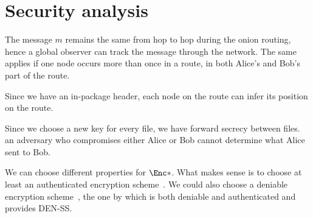\section{Security analysis}%
\label{SecurityAnalysis}


The message \(m\) remains the same from hop to hop during the onion routing, 
hence a global observer can track the message through the network.
The same applies if one node occurs more than once in a route, \eg in both 
Alice's and Bob's part of the route.

Since we have an in-package header, each node on the route can infer its 
position on the route.

Since we choose a new key for every file, we have forward secrecy between files.
\Eg an adversary who compromises either Alice or Bob cannot determine what Alice 
sent to Bob.

We can choose different properties for \(\Enc*\).
What makes sense is to choose at least an authenticated encryption 
scheme~\cite{AuthEncryption}.
We could also choose a deniable encryption scheme~\cite{DeniableEncryption}, \eg 
the one by \textcite{OTPKX} which is both deniable and authenticated and 
provides \ac{DEN-SS}.
